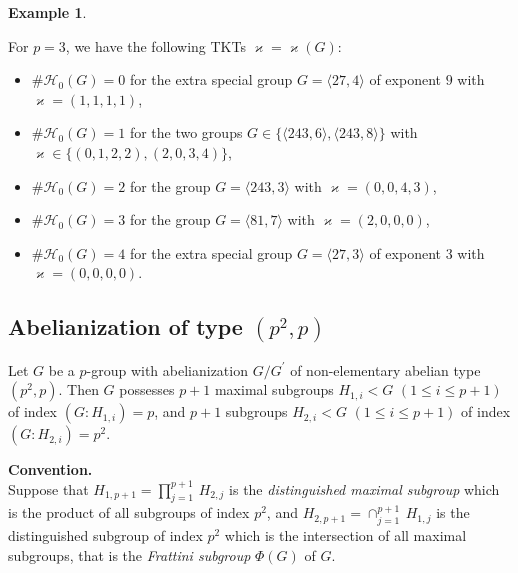 \documentclass{amsart}
\theoremstyle{definition}
\newtheorem{example}{Example}[section]
\numberwithin{equation}{section}
\begin{document}
\begin{example}
\label{exm:CounterTypePePe}

For \(p=3\), we have the following TKTs \(\varkappa=\varkappa(G)\):

\begin{itemize}

\item
\(\#\mathcal{H}_0(G)=0\) for the extra special group \(G=\langle 27,4\rangle\) of exponent \(9\)
with \(\varkappa=(1,1,1,1)\),

\item
\(\#\mathcal{H}_0(G)=1\) for the two groups \(G\in\lbrace\langle 243,6\rangle,\langle 243,8\rangle\rbrace\)
with \(\varkappa\in\lbrace (0,1,2,2),(2,0,3,4)\rbrace\),

\item
\(\#\mathcal{H}_0(G)=2\) for the group \(G=\langle 243,3\rangle\) with \(\varkappa=(0,0,4,3)\),

\item
\(\#\mathcal{H}_0(G)=3\) for the group \(G=\langle 81,7\rangle\) with \(\varkappa=(2,0,0,0)\),

\item
\(\#\mathcal{H}_0(G)=4\) for the extra special group \(G=\langle 27,3\rangle\) of exponent \(3\)
with \(\varkappa=(0,0,0,0)\).

\end{itemize}

\end{example}



\subsection{Abelianization of type \((p^2,p)\)}
\label{ss:DrvQtnPe2Pe}

Let \(G\) be a \(p\)-group with abelianization \(G/G^\prime\) of non-elementary abelian type \((p^2,p)\).
Then \(G\) possesses \(p+1\) maximal subgroups \(H_{1,i}<G\) \((1\le i\le p+1)\) of index \((G:H_{1,i})=p\),
and \(p+1\) subgroups \(H_{2,i}<G\) \((1\le i\le p+1)\) of index \((G:H_{2,i})=p^2\).

\noindent
\textbf{Convention.}\\
Suppose that \(H_{1,p+1}=\prod_{j=1}^{p+1}\,H_{2,j}\) is the \textit{distinguished maximal subgroup}
which is the product of all subgroups of index \(p^2\),
and \(H_{2,p+1}=\cap_{j=1}^{p+1}\,H_{1,j}\) is the distinguished subgroup of index \(p^2\)
which is the intersection of all maximal subgroups,
that is the \textit{Frattini subgroup} \(\Phi(G)\) of \(G\).
\end{document}

